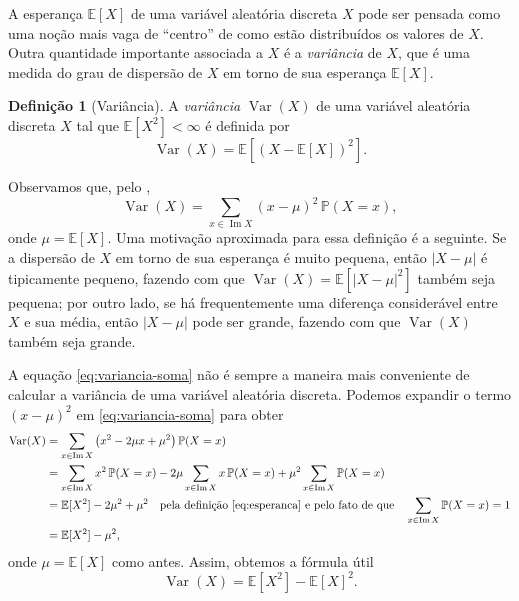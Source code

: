 \documentclass[12pt,portuguese]{article}
\theoremstyle{definition}
\newtheorem{definition}[definition]{Definição}
\begin{document}
\bigskip

A esperança \(\mathbb{E}[X]\) de uma variável aleatória discreta \(X\) pode ser
pensada como uma noção mais vaga de ``centro'' de como estão distribuídos os valores de \(X\). 
Outra quantidade importante associada a \(X\) é a \emph{variância} de \(X\), 
que é uma medida do grau de dispersão de \(X\) em torno de sua esperança \(\mathbb{E}[X]\).

\begin{definition}[Variância]\label{def:variancia}
A \emph{variância} \(\operatorname{Var}(X)\) de uma variável aleatória discreta
\(X\) tal que \(\mathbb{E}[X^2]<\infty\) é definida por
\begin{equation}\label{eq:variancia-def}
\operatorname{Var}(X) = \mathbb{E}\left[\left( X - \mathbb{E}[X] \right)^2\right].
\end{equation}
\end{definition}

Observamos que, pelo ,
\begin{equation}\label{eq:variancia-soma}
\operatorname{Var}(X) = \sum_{x \in \operatorname{Im} X} (x - \mu)^2 \, \mathbb{P}(X = x),
\end{equation}
onde \(\mu = \mathbb{E}[X]\). Uma motivação aproximada para essa definição é a
seguinte. Se a dispersão de \(X\) em torno de sua esperança é muito pequena,
então \(|X - \mu|\) é tipicamente pequeno, fazendo com que
\(\operatorname{Var}(X) = \mathbb{E}[|X - \mu|^2]\) também seja pequena; por
outro lado, se há frequentemente uma diferença considerável entre \(X\) e sua
média, então \(|X - \mu|\) pode ser grande, fazendo com que
\(\operatorname{Var}(X)\) também seja grande.

A equação \eqref{eq:variancia-soma} não é sempre a maneira mais conveniente de
calcular a variância de uma variável aleatória discreta. Podemos expandir o
termo \((x - \mu)^2\) em \eqref{eq:variancia-soma} para obter
\[
\begin{aligned}
\operatorname{Var}(X) &= \sum_{x\in\operatorname{Im}X} \left(x^2 - 2\mu x + \mu^2\right) \mathbb{P}(X = x) \\
&= \sum_{x\in\operatorname{Im}X} x^2 \, \mathbb{P}(X = x)
- 2\mu \sum_{x\in\operatorname{Im}X} x \, \mathbb{P}(X = x)
+ \mu^2 \sum_{x\in\operatorname{Im}X} \mathbb{P}(X = x) \\
&= \mathbb{E}[X^2] - 2\mu^2 + \mu^2
   \quad \text{pela definição \eqref{eq:esperanca} e pelo fato de que}
   \quad \sum_{x\in\operatorname{Im}X} \mathbb{P}(X = x) = 1 \\
&= \mathbb{E}[X^2] - \mu^2,
\end{aligned}
\]
onde \(\mu = \mathbb{E}[X]\) como antes. Assim, obtemos a fórmula útil
\begin{equation}\label{eq:variancia-formula}
\operatorname{Var}(X) = \mathbb{E}[X^2] - \mathbb{E}[X]^2.
\end{equation}
\end{document}
